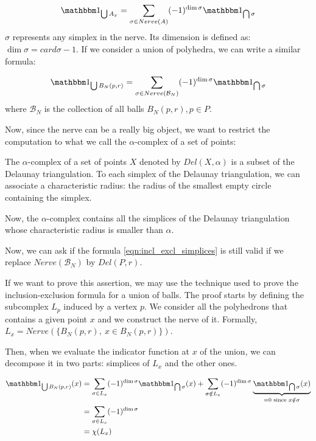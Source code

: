 $$ \indicator{\bigcup A_x} = \sum_{\sigma \in Nerve(A)} (-1)^{\dim \sigma}
\indicator{\bigcap \sigma} $$
$ \sigma $ represents any simplex in the nerve. Its dimension is defined as: $
\dim \sigma = card \sigma - 1 $. If we consider a union of polyhedra, we can write a similar formula:

\begin{equation}
    \indicator{\bigcup B_N(p, r)} = \sum_{\sigma \in Nerve(\mathcal{B}_N)} (-1)^{\dim \sigma}
    \indicator{\bigcap \sigma}
    \label{eqn:incl_excl_simplices}
\end{equation}
where $ \mathcal{B}_N $ is the collection of all balls $ B_N(p, r), p \in P $.

Now, since the nerve can be a really big object, we want to restrict the
computation to what we call the $\alpha$-complex of a set of points:

\begin{definition} The $\alpha$-complex of a set of points $ X $ denoted by $
    Del(X, \alpha) $ is a subset of the Delaunay triangulation. To each simplex
    of the Delaunay triangulation, we can associate a characteristic
    radius: the radius of the smallest empty circle containing the simplex.

    Now, the $\alpha$-complex contains all the simplices of the Delaunay
    triangulation whose characteristic radius is smaller than $\alpha$.
\end{definition}

Now, we can ask if the formula \ref{eqn:incl_excl_simplices} is still valid if
we replace $ Nerve(\mathcal{B}_N) $ by $ Del(P, r) $.

If we want to prove this assertion, we may use the technique used to prove the
inclusion-exclusion formula for a union of balls. The proof starts by defining
the subcomplex $ L_p $ induced by a vertex $ p $.  We consider all the
polyhedrons that contains a given point $ x $ and we construct the nerve of it.
Formally, $ L_x = Nerve(\{ B_N(p, r),~x \in B_N(p, r)\}) $.

Then, when we evaluate the indicator function at $ x $ of the union, we can
decompose it in two parts: simplices of $ L_x $ and the other ones.

\begin{align*}
    \indicator{\bigcup B_N(p, r)}(x) &= \sum_{\sigma \in L_x} (-1)^{\dim \sigma}
    \indicator{\bigcap \sigma}(x) + \sum_{\sigma \notin L_x} (-1)^{\dim \sigma}
    \underbrace{\indicator{\bigcap \sigma}(x)}_{= 0 \text{ since } x \notin
        \sigma} \\
    &= \sum_{\sigma \in L_x} (-1)^{\dim \sigma} \\
    &= \chi(L_x)
\end{align*}


